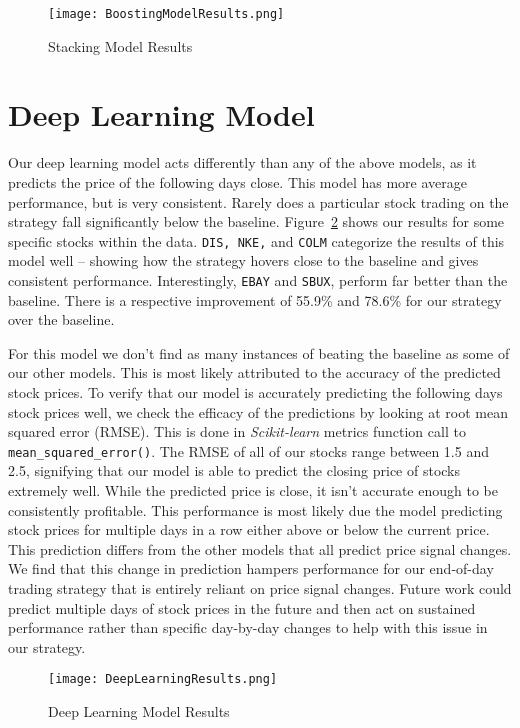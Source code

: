 \documentclass[../thesis.tex]{subfiles}
\begin{document}
\begin{figure}[h]
\centering
\texttt{[image: BoostingModelResults.png]}
\caption{Stacking Model Results \label{overflow}}
\label{stackingresults}
\end{figure}

\section{Deep Learning Model}
Our deep learning model acts differently than any of the above models, as it predicts the price of the following days close. This model has more average performance, but is very consistent. Rarely does a particular stock trading on the strategy fall significantly below the baseline. Figure~\ref{deepresults} shows our results for some specific stocks within the data. \texttt{DIS, NKE,} and \texttt{COLM} categorize the results of this model well -- showing how the strategy hovers close to the baseline and gives consistent performance. Interestingly, \texttt{EBAY} and \texttt{SBUX}, perform far better than the baseline. There is a respective improvement of 55.9\% and 78.6\% for our strategy over the baseline. 

For this model we don't find as many instances of beating the baseline as some of our other models. This is most likely attributed to the accuracy of the predicted stock prices. To verify that our model is accurately predicting the following days stock prices well, we check the efficacy of the predictions by looking at root mean squared error (RMSE). This is done in \textit{Scikit-learn} metrics function call to \texttt{mean\_squared\_error()}. The RMSE of all of our stocks range between 1.5 and 2.5, signifying that our model is able to predict the closing price of stocks extremely well. While the predicted price is close, it isn't accurate enough to be consistently profitable. This performance is most likely due the model predicting stock prices for multiple days in a row either above or below the current price. This prediction differs from the other models that all predict price signal changes. We find that this change in prediction hampers performance for our end-of-day trading strategy that is entirely reliant on price signal changes. Future work could predict multiple days of stock prices in the future and then act on sustained performance rather than specific day-by-day changes to help with this issue in our strategy. 

\begin{figure}[h]
\centering
\texttt{[image: DeepLearningResults.png]}
\caption{Deep Learning Model Results \label{overflow}}
\label{deepresults}
\end{figure}
\end{document}
